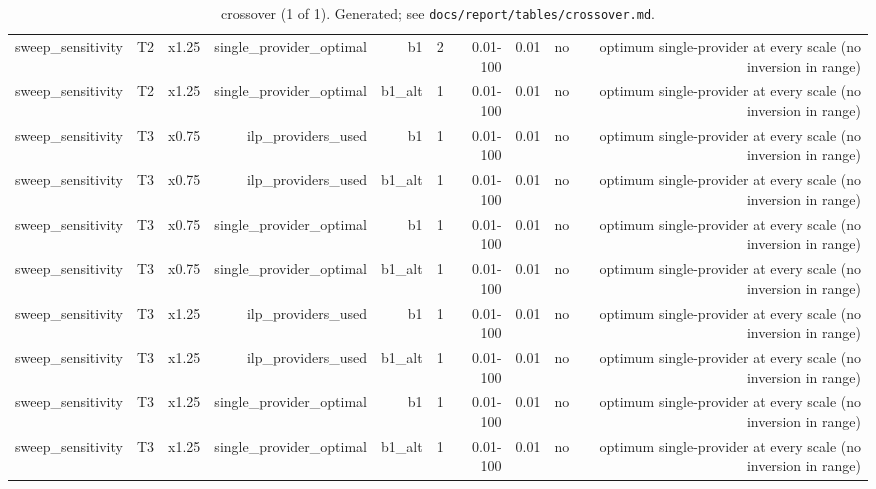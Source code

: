 \begin{table}[t]
\begin{tabular}{lrrrrrrrrr}
sweep\_sensitivity & T2 & x1.25 & single\_provider\_optimal & b1 & 2 & 0.01-100 & 0.01 & no & optimum single-provider at every scale (no inversion in range) \\
sweep\_sensitivity & T2 & x1.25 & single\_provider\_optimal & b1\_alt & 1 & 0.01-100 & 0.01 & no & optimum single-provider at every scale (no inversion in range) \\
sweep\_sensitivity & T3 & x0.75 & ilp\_providers\_used & b1 & 1 & 0.01-100 & 0.01 & no & optimum single-provider at every scale (no inversion in range) \\
sweep\_sensitivity & T3 & x0.75 & ilp\_providers\_used & b1\_alt & 1 & 0.01-100 & 0.01 & no & optimum single-provider at every scale (no inversion in range) \\
sweep\_sensitivity & T3 & x0.75 & single\_provider\_optimal & b1 & 1 & 0.01-100 & 0.01 & no & optimum single-provider at every scale (no inversion in range) \\
sweep\_sensitivity & T3 & x0.75 & single\_provider\_optimal & b1\_alt & 1 & 0.01-100 & 0.01 & no & optimum single-provider at every scale (no inversion in range) \\
sweep\_sensitivity & T3 & x1.25 & ilp\_providers\_used & b1 & 1 & 0.01-100 & 0.01 & no & optimum single-provider at every scale (no inversion in range) \\
sweep\_sensitivity & T3 & x1.25 & ilp\_providers\_used & b1\_alt & 1 & 0.01-100 & 0.01 & no & optimum single-provider at every scale (no inversion in range) \\
sweep\_sensitivity & T3 & x1.25 & single\_provider\_optimal & b1 & 1 & 0.01-100 & 0.01 & no & optimum single-provider at every scale (no inversion in range) \\
sweep\_sensitivity & T3 & x1.25 & single\_provider\_optimal & b1\_alt & 1 & 0.01-100 & 0.01 & no & optimum single-provider at every scale (no inversion in range) \\
\bottomrule
\end{tabular}
\caption{crossover (1 of 1). Generated; see \texttt{docs/report/tables/crossover.md}.}
\label{tab:crossover-1}
\end{table}
